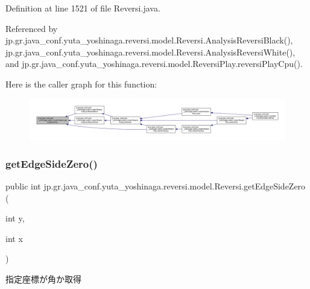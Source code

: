 Definition at line 1521 of file Reversi.\+java.



Referenced by jp.\+gr.\+java\+\_\+conf.\+yuta\+\_\+yoshinaga.\+reversi.\+model.\+Reversi.\+Analysis\+Reversi\+Black(), jp.\+gr.\+java\+\_\+conf.\+yuta\+\_\+yoshinaga.\+reversi.\+model.\+Reversi.\+Analysis\+Reversi\+White(), and jp.\+gr.\+java\+\_\+conf.\+yuta\+\_\+yoshinaga.\+reversi.\+model.\+Reversi\+Play.\+reversi\+Play\+Cpu().

Here is the caller graph for this function\+:\nopagebreak
\begin{figure}[H]
\begin{center}
\leavevmode
\includegraphics[width=350pt]{classjp_1_1gr_1_1java__conf_1_1yuta__yoshinaga_1_1reversi_1_1model_1_1_reversi_afc0b642f56e39a28ab5adc48c8fd2b98_icgraph}
\end{center}
\end{figure}
\mbox{\label{classjp_1_1gr_1_1java__conf_1_1yuta__yoshinaga_1_1reversi_1_1model_1_1_reversi_a3989b051544745724fc372d4a6b8a7f7}} 
\subsubsection{\texorpdfstring{get\+Edge\+Side\+Zero()}{getEdgeSideZero()}}
{\footnotesize\ttfamily public int jp.\+gr.\+java\+\_\+conf.\+yuta\+\_\+yoshinaga.\+reversi.\+model.\+Reversi.\+get\+Edge\+Side\+Zero (\begin{DoxyParamCaption}\item[{int}]{y,  }\item[{int}]{x }\end{DoxyParamCaption})}



指定座標が角か取得 


